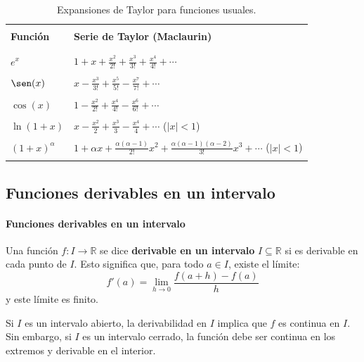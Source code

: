 \documentclass[12pt, a4paper]{article}
\theoremstyle{rioplatense}
\begin{document}
\begin{table}[h]
\centering
\begin{tabular}{ll}
\hline \\
\textbf{Función} & \textbf{Serie de Taylor (Maclaurin)} \\ \\
\hline \\
\( e^x \) & \( \displaystyle 1 + x + \frac{x^2}{2!} + \frac{x^3}{3!} + \frac{x^4}{4!} + \cdots \) \\ \\
\( \sen(x) \) & \( \displaystyle x - \frac{x^3}{3!} + \frac{x^5}{5!} - \frac{x^7}{7!} + \cdots \) \\ \\
\( \cos(x) \) & \( \displaystyle 1 - \frac{x^2}{2!} + \frac{x^4}{4!} - \frac{x^6}{6!} + \cdots \) \\ \\
\( \ln(1+x) \) & \( \displaystyle x - \frac{x^2}{2} + \frac{x^3}{3} - \frac{x^4}{4} + \cdots \) \quad (\( |x| < 1 \)) \\ \\
\( (1+x)^\alpha \) & \( \displaystyle 1 + \alpha x + \frac{\alpha(\alpha-1)}{2!}x^2 + \frac{\alpha(\alpha-1)(\alpha-2)}{3!}x^3 + \cdots \) \quad (\( |x| < 1 \)) \\ \\
\hline
\end{tabular}
\caption{Expansiones de Taylor para funciones usuales.}
\end{table}

\newpage

\subsection{Funciones derivables en un intervalo}

\paragraph{Funciones derivables en un intervalo}
Una función \( f: I \to \mathbb{R} \) se dice \textbf{derivable en un intervalo} \( I \subseteq \mathbb{R} \) si es derivable en cada punto de \( I \). Esto significa que, para todo \( a \in I \), existe el límite:
\[
f'(a) = \lim_{h \to 0} \frac{f(a+h) - f(a)}{h}
\]
y este límite es finito.

Si \( I \) es un intervalo abierto, la derivabilidad en \( I \) implica que \( f \) es continua en \( I \). Sin embargo, si \( I \) es un intervalo cerrado, la función debe ser continua en los extremos y derivable en el interior.
\end{document}
